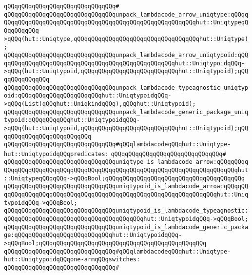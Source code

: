 \verb|qQQqqQQqqQQqqQQqqQQqqQQqqQQqqQQq#|\newline
\verb|qQQqqQQqqQQqqQQqqQQqqQQqqQQqqQQqunpack_lambdacode_arrow_uniqtype:qQQqqQQqqQQqqQQqqQQqqQQqqQQqqQQqqQQqqQQqqQQqqQQqqQQqqQQqqQQqhut::UniqtypeqQQqqQQqqQQq->qQQq(hut::Uniqtype,qQQqqQQqqQQqqQQqqQQqqQQqqQQqqQQqqQQqhut::Uniqtype);|\newline
\verb|qQQqqQQqqQQqqQQqqQQqqQQqqQQqqQQqunpack_lambdacode_arrow_uniqtypoid:qQQqqQQqqQQqqQQqqQQqqQQqqQQqqQQqqQQqqQQqqQQqqQQqqQQqhut::UniqtypoidqQQq->qQQq(hut::Uniqtypoid,qQQqqQQqqQQqqQQqqQQqqQQqqQQqhut::Uniqtypoid);qQQqqQQqqQQqqQQq|\newline
\verb|qQQqqQQqqQQqqQQqqQQqqQQqqQQqqQQqunpack_lambdacode_typeagnostic_uniqtypoid:qQQqqQQqqQQqqQQqqQQqqQQqhut::UniqtypoidqQQq->qQQq(List(qQQqhut::UniqkindqQQq),qQQqhut::Uniqtypoid);|\newline
\verb|qQQqqQQqqQQqqQQqqQQqqQQqqQQqqQQqunpack_lambdacode_generic_package_uniqtypoid:qQQqqQQqqQQqhut::UniqtypoidqQQq->qQQq(hut::Uniqtypoid,qQQqqQQqqQQqqQQqqQQqqQQqqQQqhut::Uniqtypoid);qQQqqQQqqQQqqQQqqQQqqQQqqQQq|\newline
\newline
\verb|qQQqqQQqqQQqqQQqqQQqqQQqqQQqqQQq#qQQqlambdacodeqQQqhut::Uniqtype-hut::UniqtypoidqQQqpredicates:|\newline
\verb|qQQqqQQqqQQqqQQqqQQqqQQqqQQqqQQq#|\newline
\verb|qQQqqQQqqQQqqQQqqQQqqQQqqQQqqQQquniqtype_is_lambdacode_arrow:qQQqqQQqqQQqqQQqqQQqqQQqqQQqqQQqqQQqqQQqqQQqqQQqqQQqqQQqqQQqqQQqqQQqqQQqqQQqhut::UniqtypeqQQqqQQq->qQQqBool;qQQqqQQqqQQqqQQqqQQqqQQqqQQqqQQqqQQqqQQq|\newline
\verb|qQQqqQQqqQQqqQQqqQQqqQQqqQQqqQQquniqtypoid_is_lambdacode_arrow:qQQqqQQqqQQqqQQqqQQqqQQqqQQqqQQqqQQqqQQqqQQqqQQqqQQqqQQqqQQqqQQqqQQqhut::UniqtypoidqQQq->qQQqBool;|\newline
\verb|qQQqqQQqqQQqqQQqqQQqqQQqqQQqqQQquniqtypoid_is_lambdacode_typeagnostic:qQQqqQQqqQQqqQQqqQQqqQQqqQQqqQQqqQQqqQQqhut::UniqtypoidqQQq->qQQqBool;|\newline
\verb|qQQqqQQqqQQqqQQqqQQqqQQqqQQqqQQquniqtypoid_is_lambdacode_generic_package:qQQqqQQqqQQqqQQqqQQqqQQqqQQqhut::UniqtypoidqQQq->qQQqBool;qQQqqQQqqQQqqQQqqQQqqQQqqQQqqQQqqQQqqQQqqQQqqQQq|\newline
\newline
\verb|qQQqqQQqqQQqqQQqqQQqqQQqqQQqqQQq#qQQqlambdacodeqQQqhut::Uniqtype-hut::UniqtypoidqQQqone-armqQQqswitches:|\newline
\verb|qQQqqQQqqQQqqQQqqQQqqQQqqQQqqQQq#|\newline
